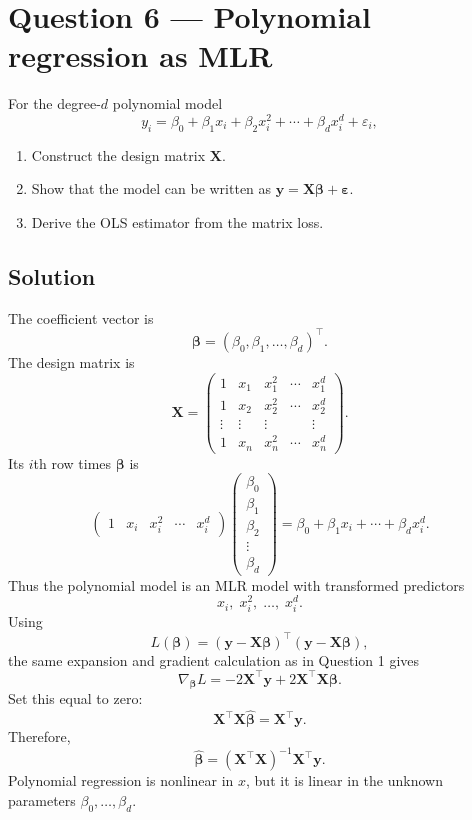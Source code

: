 ﻿\documentclass[11pt]{article}
\newcommand{\yvec}{\mathbf y}
\newcommand{\bvec}{\boldsymbol\beta}
\newcommand{\evec}{\boldsymbol\varepsilon}
\newcommand{\xmat}{\mathbf X}
\begin{document}
\newpage
\section*{Question 6 --- Polynomial regression as MLR}
For the degree-$d$ polynomial model
\[
y_i=\beta_0+\beta_1x_i+\beta_2x_i^2+\cdots+\beta_dx_i^d+\varepsilon_i,
\]
\begin{enumerate}[label=(\alph*)]
\item Construct the design matrix $\xmat$.
\item Show that the model can be written as $\yvec=\xmat\bvec+\evec$.
\item Derive the OLS estimator from the matrix loss.
\end{enumerate}

\subsection*{Solution}
The coefficient vector is
\[
\bvec=(\beta_0,\beta_1,\ldots,\beta_d)^\top.
\]
The design matrix is
\[
\xmat=
\begin{pmatrix}
1&x_1&x_1^2&\cdots&x_1^d\\
1&x_2&x_2^2&\cdots&x_2^d\\
\vdots&\vdots&\vdots&&\vdots\\
1&x_n&x_n^2&\cdots&x_n^d
\end{pmatrix}.
\]
Its $i$th row times $\bvec$ is
\[
\begin{pmatrix}1&x_i&x_i^2&\cdots&x_i^d\end{pmatrix}
\begin{pmatrix}\beta_0\\\beta_1\\\beta_2\\\vdots\\\beta_d\end{pmatrix}
=\beta_0+\beta_1x_i+\cdots+\beta_dx_i^d.
\]
Thus the polynomial model is an MLR model with transformed predictors
\[
x_i,\;x_i^2,\;\ldots,\;x_i^d.
\]
Using
\[
L(\bvec)=(\yvec-\xmat\bvec)^\top(\yvec-\xmat\bvec),
\]
the same expansion and gradient calculation as in Question 1 gives
\[
\nabla_{\bvec}L
=-2\xmat^\top\yvec+2\xmat^\top\xmat\bvec.
\]
Set this equal to zero:
\[
\xmat^\top\xmat\widehat{\bvec}=\xmat^\top\yvec.
\]
Therefore,
\[
\boxed{
\widehat{\bvec}=(\xmat^\top\xmat)^{-1}\xmat^\top\yvec
}.
\]
Polynomial regression is nonlinear in $x$, but it is linear in the unknown parameters $\beta_0,\ldots,\beta_d$.
\end{document}
